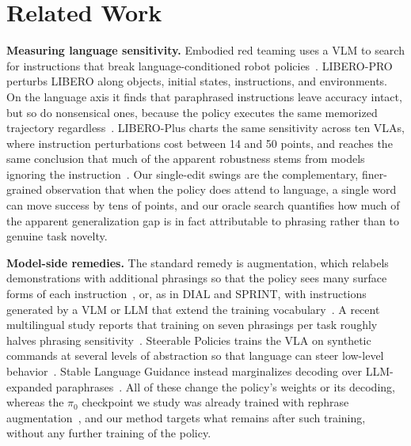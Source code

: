 \documentclass[letterpaper, 10 pt, conference]{ieeeconf} %
\begin{document}
\section{Related Work}



\textbf{Measuring language sensitivity. }
Embodied red teaming uses a VLM to search for instructions that break language-conditioned robot policies~\cite{karnik2024embodied}. LIBERO-PRO perturbs LIBERO along objects, initial states, instructions, and environments. On the language axis it finds that paraphrased instructions leave accuracy intact, but so do nonsensical ones, because the policy executes the same memorized trajectory regardless~\cite{zhou2025liberopro}. LIBERO-Plus charts the same sensitivity across ten VLAs, where instruction perturbations cost between 14 and 50 points, and reaches the same conclusion that much of the apparent robustness stems from models ignoring the instruction~\cite{fei2025liberoplus}. Our single-edit swings are the complementary, finer-grained observation that when the policy does attend to language, a single word can move success by tens of points, and our oracle search quantifies how much of the apparent generalization gap is in fact attributable to phrasing rather than to genuine task novelty.

\textbf{Model-side remedies. }
The standard remedy is augmentation, which relabels demonstrations with additional phrasings so that the policy sees many surface forms of each
instruction~\cite{kwok2026scaling}, or, as in DIAL and SPRINT, with instructions generated by a VLM or LLM that extend the training vocabulary~\cite{xiao2023dial, zhang2024sprint}. A recent multilingual study reports that training on seven phrasings per task roughly halves phrasing sensitivity~\cite{kirouane2026greek}.
Steerable Policies trains the VLA on synthetic commands at several levels of abstraction so that language can steer low-level behavior~\cite{chen2026steerable}. Stable Language Guidance instead marginalizes decoding over LLM-expanded paraphrases~\cite{zhan2026stable}. All of these change the policy's weights or its decoding, whereas the $\pi_0$ checkpoint we study was already trained with rephrase augmentation~\cite{intact}, and our method targets what remains after such training, without any further training of the policy.
\end{document}
